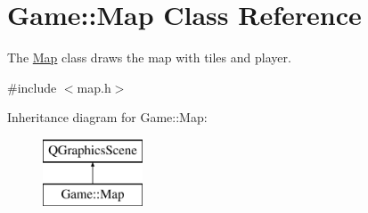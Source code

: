 \hypertarget{class_game_1_1_map}{\section{Game\-:\-:Map Class Reference}
\label{class_game_1_1_map}
}


The \hyperlink{class_game_1_1_map}{Map} class draws the map with tiles and player.  




{\ttfamily \#include $<$map.\-h$>$}

Inheritance diagram for Game\-:\-:Map\-:\begin{figure}[H]
\begin{center}
\leavevmode
\includegraphics[height=2.000000cm]{class_game_1_1_map}
\end{center}
\end{figure}
